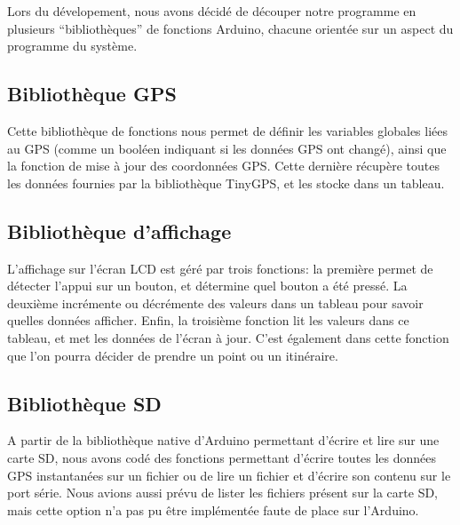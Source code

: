 \documentclass[a4paper,12pt]{article}
\begin{document}
Lors du dévelopement, nous avons décidé de découper notre programme en plusieurs ``bibliothèques'' de fonctions Arduino, chacune orientée sur un aspect du programme du système.
\subsection{Bibliothèque GPS}

Cette bibliothèque de fonctions nous permet de définir les variables globales liées au GPS (comme un booléen indiquant si les données GPS ont changé), ainsi que la fonction de mise à jour des coordonnées GPS. Cette dernière récupère toutes les données fournies par la bibliothèque TinyGPS, et les stocke dans un tableau.
\subsection{Bibliothèque d'affichage}

L'affichage sur l'écran LCD est géré par trois fonctions: la première permet de détecter l'appui sur un bouton, et détermine quel bouton a été pressé. La deuxième incrémente ou décrémente des valeurs dans un tableau pour savoir quelles données afficher. Enfin, la troisième fonction lit les valeurs dans ce tableau, et met les données de l'écran à jour. C'est également dans cette fonction que l'on pourra décider de prendre un point ou un itinéraire.
\subsection{Bibliothèque SD}

A partir de la bibliothèque native d'Arduino permettant d'écrire et lire sur une carte SD, nous avons codé des fonctions permettant d'écrire toutes les données GPS instantanées sur un fichier ou de lire un fichier et d'écrire son contenu sur le port série. Nous avions aussi prévu de lister les fichiers présent sur la carte SD, mais cette option n'a pas pu être implémentée faute de place sur l'Arduino.

\newline
\end{document}
